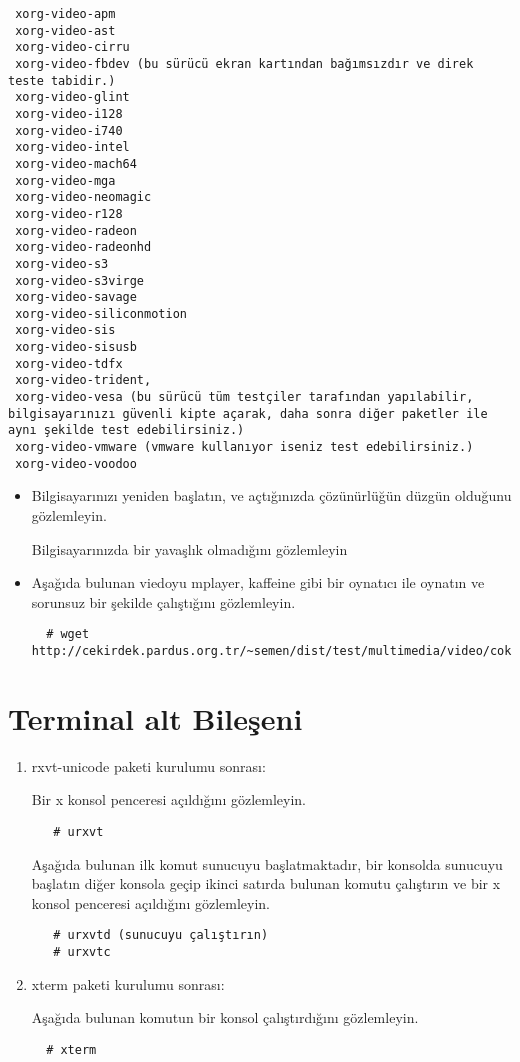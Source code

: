 \documentclass[a4paper,10pt]{article}
\begin{document}
\begin{enumerate}
\begin{verbatim}
 xorg-video-apm 
 xorg-video-ast
 xorg-video-cirru
 xorg-video-fbdev (bu sürücü ekran kartından bağımsızdır ve direk teste tabidir.)
 xorg-video-glint
 xorg-video-i128
 xorg-video-i740
 xorg-video-intel
 xorg-video-mach64
 xorg-video-mga
 xorg-video-neomagic
 xorg-video-r128
 xorg-video-radeon
 xorg-video-radeonhd
 xorg-video-s3
 xorg-video-s3virge
 xorg-video-savage
 xorg-video-siliconmotion
 xorg-video-sis
 xorg-video-sisusb
 xorg-video-tdfx
 xorg-video-trident,
 xorg-video-vesa (bu sürücü tüm testçiler tarafından yapılabilir, bilgisayarınızı güvenli kipte açarak, daha sonra diğer paketler ile aynı şekilde test edebilirsiniz.)
 xorg-video-vmware (vmware kullanıyor iseniz test edebilirsiniz.)
 xorg-video-voodoo
\end{verbatim}

\begin{itemize}
 \item Bilgisayarınızı yeniden başlatın, ve açtığınızda çözünürlüğün düzgün olduğunu gözlemleyin.

 Bilgisayarınızda bir yavaşlık olmadığını gözlemleyin
 \item Aşağıda bulunan viedoyu mplayer, kaffeine gibi bir oynatıcı ile oynatın ve sorunsuz bir şekilde çalıştığını gözlemleyin.
 \begin{verbatim}
  # wget http://cekirdek.pardus.org.tr/~semen/dist/test/multimedia/video/cokluortam/DVD.mpg
 \end{verbatim}


\end{itemize}

\end{enumerate}

\section{Terminal alt Bileşeni}
\begin{enumerate}
 \item rxvt-unicode paketi kurulumu sonrası:

Bir x konsol penceresi açıldığını gözlemleyin.
  \begin{verbatim}
   # urxvt
  \end{verbatim}

Aşağıda bulunan ilk komut sunucuyu başlatmaktadır, bir konsolda sunucuyu başlatın diğer konsola geçip ikinci satırda bulunan komutu çalıştırın ve bir x konsol penceresi açıldığını gözlemleyin.
  \begin{verbatim}
   # urxvtd (sunucuyu çalıştırın)
   # urxvtc
  \end{verbatim}

\item xterm paketi kurulumu sonrası:

Aşağıda bulunan komutun bir konsol çalıştırdığını gözlemleyin.
 \begin{verbatim}
  # xterm
 \end{verbatim}

\end{enumerate}
\end{document}
